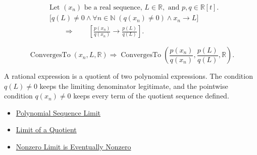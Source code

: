 \begin{remark*}
\[
\begin{aligned}
&\text{Let } (x_n) \text{ be a real sequence, } L\in\mathbb{R},
  \text{ and } p,q\in\mathbb{R}[t].\\
&\bigl[
q(L)\neq 0
\land
\forall n\in\mathbb{N}\;(q(x_n)\neq 0)
\land
x_n\to L
\bigr]\\
&\qquad\Longrightarrow\qquad
\left[
\frac{p(x_n)}{q(x_n)}\to\frac{p(L)}{q(L)}
\right].
\end{aligned}
\]
\end{remark*}

\begin{remark*}
\[
\operatorname{ConvergesTo}(x_n,L,\mathbb{R})
\Longrightarrow
\operatorname{ConvergesTo}
\left(\frac{p(x_n)}{q(x_n)},\frac{p(L)}{q(L)},\mathbb{R}\right).
\]
\end{remark*}

\begin{remark*}[Interpretation]
A rational expression is a quotient of two polynomial expressions. The
condition $q(L)\neq 0$ keeps the limiting denominator legitimate, and the
pointwise condition $q(x_n)\neq 0$ keeps every term of the quotient sequence
defined.
\end{remark*}

\begin{dependencies}
\begin{itemize}
  \item \hyperref[thm:polynomial-sequence-limit]{Polynomial Sequence Limit}
  \item \hyperref[thm:limit-of-a-quotient]{Limit of a Quotient}
  \item \hyperref[thm:nonzero-limit-eventually-nonzero]{Nonzero Limit is Eventually Nonzero}
\end{itemize}
\end{dependencies}
